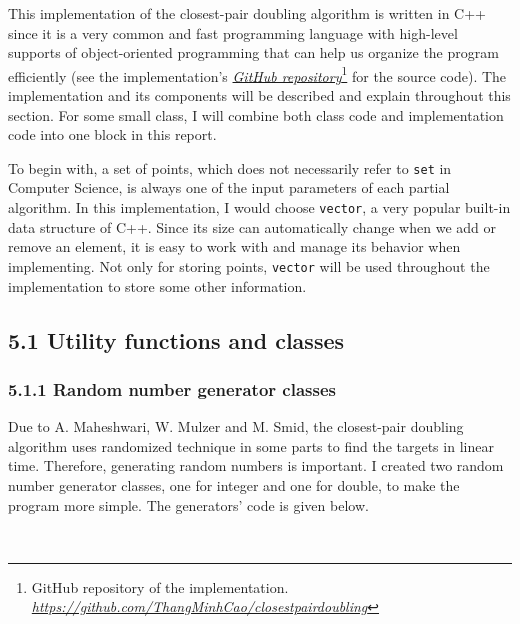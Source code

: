 \documentclass[12pt,english,]{article}
\newcommand{\code}[1]{\colorbox{light-gray}{\texttt{#1}}}
\begin{document}
This implementation of the closest-pair doubling algorithm is written in
C++ since it is a very common and fast programming language with
high-level supports of object-oriented programming that can help us
organize the program efficiently (see the implementation's
\href{https://github.com/ThangMinhCao/closestpairdoubling}{\emph{GitHub
repository}}\footnote{GitHub repository of the implementation.
  \href{https://github.com/ThangMinhCao/closestpairdoubling}{\emph{https://github.com/ThangMinhCao/closestpairdoubling}}}
for the source code). The implementation and its components will be
described and explain throughout this section. For some small class, I
will combine both class code and implementation code into one block in
this report.

To begin with, a set of points, which does not necessarily refer to
\code{set} in Computer Science, is always one of the input parameters of
each partial algorithm. In this implementation, I would choose
\code{vector}, a very popular built-in data structure of C++. Since its
size can automatically change when we add or remove an element, it is
easy to work with and manage its behavior when implementing. Not only
for storing points, \code{vector} will be used throughout the
implementation to store some other information.

\hypertarget{section5.1}{%
\subsection{5.1 Utility functions and classes}\label{section5.1}}

\hypertarget{section5.1.1}{%
\subsubsection{5.1.1 Random number generator
classes}\label{section5.1.1}}

Due to A. Maheshwari, W. Mulzer and M. Smid, the closest-pair doubling
algorithm uses randomized technique in some parts to find the targets in
linear time. Therefore, generating random numbers is important. I
created two random number generator classes, one for integer and one for
double, to make the program more simple. The generators' code is given
below.

~
\end{document}
